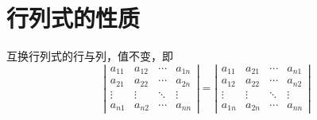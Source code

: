 \section{行列式的性质}

\begin{xingzhi}
  互换行列式的行与列，值不变，即
  \begin{equation}
    \left|
      \begin{array}{cccc}
        a_{11}  &  a_{12} & \cdots & a_{1n} \\
        a_{21}  &  a_{22} & \cdots & a_{2n} \\
        \vdots & \vdots & \ddots & \vdots\\  
        a_{n1}  &  a_{n2} & \cdots & a_{nn} 
      \end{array}
    \right|
    =
    \left|
      \begin{array}{cccc}
        a_{11}  &  a_{21} & \cdots & a_{n1} \\
        a_{12}  &  a_{22} & \cdots & a_{n2} \\
        \vdots & \vdots & \ddots & \vdots\\  
        a_{1n}  &  a_{2n} & \cdots & a_{nn} 
      \end{array}
    \right|
  \end{equation}
\end{xingzhi}

